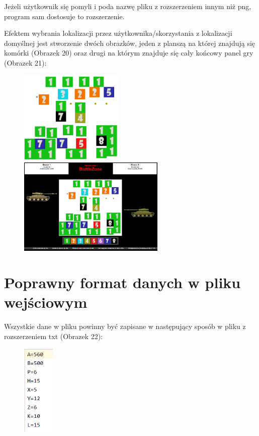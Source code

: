 \documentclass{article}
\begin{document}
Jeżeli użytkownik się pomyli i poda nazwę pliku z rozszerzeniem innym niż png, program sam dostosuje to rozszerzenie.

Efektem wybrania lokalizacji przez użytkownika/skorzystania z lokalizacji domyślnej jest stworzenie dwóch obrazków, jeden z planszą na której znajdują się komórki (Obrazek 20) oraz drugi na którym znajduje się cały końcowy panel gry (Obrazek 21):

\begin{figure}[hbt!]
 \begin{minipage}{5cm}
    \centering
    \includegraphics[width=5cm]{koncowa_planszaBoard.png}
 \end{minipage}
 \begin{minipage}{7cm}
    \centering
    \includegraphics[width=7cm]{koncowa_planszaPanel.png}
 \end{minipage}
\end{figure}


\section{Poprawny format danych w pliku wejściowym}
Wszystkie dane w pliku powinny być zapisane w następujący sposób w pliku z rozszerzeniem txt (Obrazek 22):
\begin{figure} [hbt!]
    \centering
    \includegraphics[width=1.5cm]{plik_conf.png}
\end{figure}
\end{document}
